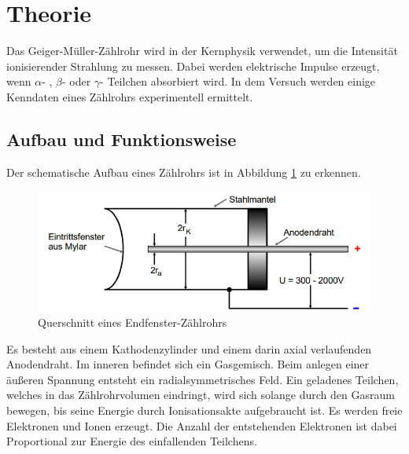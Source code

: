 \section{Theorie}
\label{sec:Theorie}
Das Geiger-Müller-Zählrohr wird in der Kernphysik verwendet, um die Intensität ionisierender Strahlung zu messen.
Dabei werden elektrische Impulse erzeugt, wenn $\alpha$- , $\beta$- oder $\gamma$- Teilchen absorbiert wird. In dem Versuch werden
einige Kenndaten eines Zählrohrs experimentell ermittelt.
\subsection{Aufbau und Funktionsweise}
Der schematische Aufbau eines Zählrohrs ist in Abbildung \ref{fig:aufbau} zu erkennen.
\begin{figure}
    \centering
    \includegraphics[scale=0.4]{pics/Aufbau.png}
    \caption{Querschnitt eines Endfenster-Zählrohrs}
    \label{fig:aufbau}
  \end{figure}
Es besteht aus einem Kathodenzylinder und einem darin axial verlaufenden Anodendraht. Im inneren befindet sich ein Gasgemisch.
Beim anlegen einer äußeren Spannung entsteht ein radialsymmetrisches Feld. Ein geladenes Teilchen, welches in das Zählrohrvolumen eindringt,
wird sich solange durch den Gasraum bewegen, bis seine Energie durch Ionisationsakte aufgebraucht ist. 
Es werden freie Elektronen und Ionen erzeugt. Die Anzahl der entstehenden Elektronen ist dabei Proportional zur Energie des einfallenden Teilchens.
